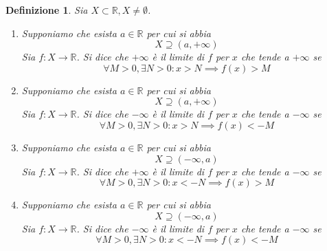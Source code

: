 \documentclass[11pt]{book}
\newtheorem{definition}{Definizione}[chapter]
\begin{document}
\begin{definition}
    Sia $X\subset\mathbb{R},X\neq\emptyset$.
    \begin{enumerate}
        \item Supponiamo che esista $a\in\mathbb{R}$ per cui si abbia
        \begin{equation*}
            X\supseteq(a,+\infty)
        \end{equation*}
        Sia $f:X\rightarrow\mathbb{R}$. Si dice che $+\infty$ è il limite di $f$ per $x$ che tende
        a $+\infty$ se 
        \begin{equation*}
            \forall M>0,\exists N>0:x>N\implies f(x)>M
        \end{equation*}
        \item Supponiamo che esista $a\in\mathbb{R}$ per cui si abbia
        \begin{equation*}
            X\supseteq(a,+\infty)
        \end{equation*}
        Sia $f:X\rightarrow\mathbb{R}$. Si dice che $-\infty$ è il limite di $f$ per $x$ che tende
        a $-\infty$ se 
        \begin{equation*}
            \forall M>0,\exists N>0:x>N\implies f(x)<-M
        \end{equation*}
        \item Supponiamo che esista $a\in\mathbb{R}$ per cui si abbia
        \begin{equation*}
            X\supseteq(-\infty,a)
        \end{equation*}
        Sia $f:X\rightarrow\mathbb{R}$. Si dice che $+\infty$ è il limite di $f$ per $x$ che tende
        a $-\infty$ se 
        \begin{equation*}
            \forall M>0,\exists N>0:x<-N\implies f(x)>M
        \end{equation*}
        \item Supponiamo che esista $a\in\mathbb{R}$ per cui si abbia
        \begin{equation*}
            X\supseteq(-\infty,a)
        \end{equation*}
        Sia $f:X\rightarrow\mathbb{R}$. Si dice che $-\infty$ è il limite di $f$ per $x$ che tende
        a $-\infty$ se 
        \begin{equation*}
            \forall M>0,\exists N>0:x<-N\implies f(x)<-M
        \end{equation*}
    \end{enumerate}
\end{definition}
\end{document}
